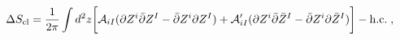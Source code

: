 \begin{equation}
\Delta S_{\rm cl}= {1\over 2\pi }\int d^2z \biggl[ 
 {\cal A}_{iI} (   \partial Z^i \bar \partial   Z^I     -
\bar\partial Z^i \partial   Z^I) +
{\cal A}_{iI}' (   \partial Z^i \bar \partial   \bar Z^I        -
\bar\partial Z^i \partial   \bar Z^I) \biggr] - {\rm h.c.} \;,
\end{equation}

